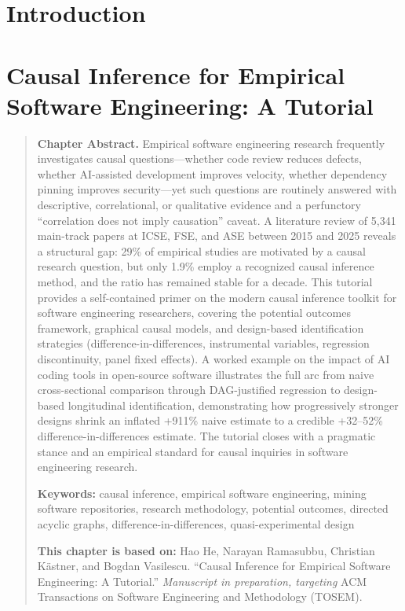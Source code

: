 \documentclass[12pt, openany]{cmuthesis}
\newcommand{\chapterfrontmatter}[3]{%
    \vspace{1em}%
    \begingroup
    \begin{quote}
    \noindent\textbf{Chapter Abstract.} #1\par
    \vspace{0.8em}%
    \noindent\textbf{Keywords:} #2\par
    \vspace{0.8em}%
    \noindent\textbf{This chapter is based on:} #3\par
    \end{quote}
    \endgroup
    \vspace{1em}%
}
\begin{document}
\clearpage\thispagestyle{empty}\null\clearpage

\tableofcontents



\mainmatter

\chapter{Introduction}
\label{chp:intro}



\chapter{Causal Inference for Empirical Software Engineering: A Tutorial}
\label{chp:background}

\chapterfrontmatter{%
Empirical software engineering research frequently investigates causal questions---whether code review reduces defects, whether AI-assisted development improves velocity, whether dependency pinning improves security---yet such questions are routinely answered with descriptive, correlational, or qualitative evidence and a perfunctory ``correlation does not imply causation'' caveat.
A literature review of 5{,}341 main-track papers at ICSE, FSE, and ASE between 2015 and 2025 reveals a structural gap: 29\% of empirical studies are motivated by a causal research question, but only 1.9\% employ a recognized causal inference method, and the ratio has remained stable for a decade.
This tutorial provides a self-contained primer on the modern causal inference toolkit for software engineering researchers, covering the potential outcomes framework, graphical causal models, and design-based identification strategies (difference-in-differences, instrumental variables, regression discontinuity, panel fixed effects).
A worked example on the impact of AI coding tools in open-source software illustrates the full arc from naive cross-sectional comparison through DAG-justified regression to design-based longitudinal identification, demonstrating how progressively stronger designs shrink an inflated +911\% naive estimate to a credible +32--52\% difference-in-differences estimate.
The tutorial closes with a pragmatic stance and an empirical standard for causal inquiries in software engineering research.%
}{%
causal inference, empirical software engineering, mining software repositories, research methodology, potential outcomes, directed acyclic graphs, difference-in-differences, quasi-experimental design%
}{%
Hao He, Narayan Ramasubbu, Christian Kästner, and Bogdan Vasilescu.
``Causal Inference for Empirical Software Engineering: A Tutorial.''
\emph{Manuscript in preparation, targeting} ACM Transactions on Software Engineering and Methodology (TOSEM).%
}
\end{document}
